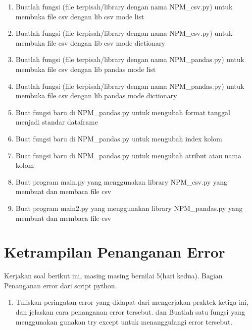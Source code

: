 \begin{enumerate}
\item
Buatlah fungsi (file terpisah/library dengan nama NPM\_csv.py) untuk membuka file csv dengan lib csv mode list
\item
Buatlah fungsi (file terpisah/library dengan nama NPM\_csv.py) untuk membuka file csv dengan lib csv mode dictionary
\item
Buatlah fungsi (file terpisah/library dengan nama NPM\_pandas.py) untuk membuka file csv dengan lib pandas mode list
\item
Buatlah fungsi (file terpisah/library dengan nama NPM\_pandas.py) untuk membuka file csv dengan lib pandas mode dictionary
\item
Buat fungsi baru di NPM\_pandas.py untuk mengubah format tanggal menjadi standar dataframe
\item
Buat fungsi baru di NPM\_pandas.py untuk mengubah index kolom
\item
Buat fungsi baru di NPM\_pandas.py untuk mengubah atribut atau nama kolom
\item
Buat program main.py yang menggunakan library NPM\_csv.py yang membuat dan membaca file csv
\item
Buat program main2.py yang menggunakan library NPM\_pandas.py yang membuat dan membaca file csv
\end{enumerate}




\section{Ketrampilan Penanganan Error}
Kerjakan soal berikut ini, masing masing bernilai 5(hari kedua). Bagian Penanganan error dari script python.
\begin{enumerate}
\item
Tuliskan peringatan error yang didapat dari mengerjakan praktek ketiga ini, dan jelaskan cara penanganan error tersebut.
dan Buatlah satu fungsi yang menggunakan gunakan try except untuk menanggulangi error tersebut.
\end{enumerate}



